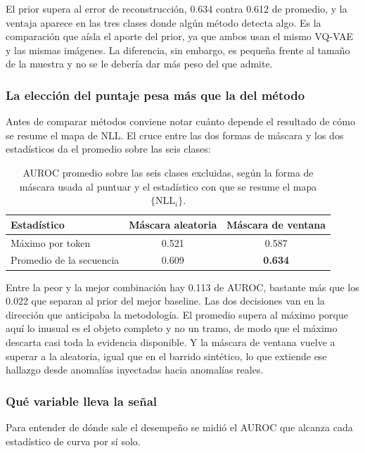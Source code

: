 El prior supera al error de reconstrucción, 0.634 contra 0.612 de promedio, y la ventaja aparece en las tres clases donde algún método detecta algo. Es la comparación que aísla el aporte del prior, ya que ambos usan el mismo VQ-VAE y las mismas imágenes. La diferencia, sin embargo, es pequeña frente al tamaño de la muestra y no se le debería dar más peso del que admite.

\subsubsection*{La elección del puntaje pesa más que la del método}

Antes de comparar métodos conviene notar cuánto depende el resultado de cómo se resume el mapa de NLL. El cruce entre las dos formas de máscara y los dos estadísticos da el promedio sobre las seis clases:

\begin{table}[H]
\centering
\begin{tabular}{|l|c|c|}
\hline
\textbf{Estadístico} & \textbf{Máscara aleatoria} & \textbf{Máscara de ventana} \\
\hline
Máximo por token & 0.521 & 0.587 \\
Promedio de la secuencia & 0.609 & \textbf{0.634} \\
\hline
\end{tabular}
\caption{AUROC promedio sobre las seis clases excluidas, según la forma de máscara usada al puntuar y el estadístico con que se resume el mapa $\{\mathrm{NLL}_i\}$.}
\label{tab:heldout_puntaje}
\end{table}

Entre la peor y la mejor combinación hay 0.113 de AUROC, bastante más que los 0.022 que separan al prior del mejor baseline. Las dos decisiones van en la dirección que anticipaba la metodología. El promedio supera al máximo porque aquí lo inusual es el objeto completo y no un tramo, de modo que el máximo descarta casi toda la evidencia disponible. Y la máscara de ventana vuelve a superar a la aleatoria, igual que en el barrido sintético, lo que extiende ese hallazgo desde anomalías inyectadas hacia anomalías reales.

\subsubsection*{Qué variable lleva la señal}

Para entender de dónde sale el desempeño se midió el AUROC que alcanza cada estadístico de curva por sí solo.

